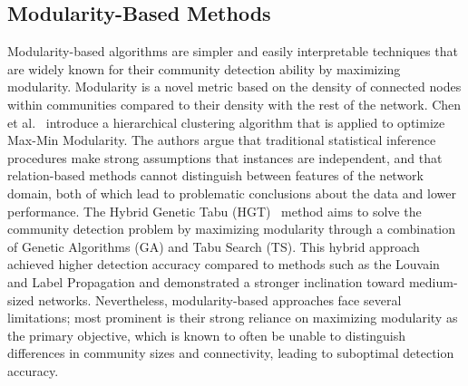 \documentclass{article}
\begin{document}
\subsection{Modularity-Based Methods}
Modularity-based algorithms are simpler and easily interpretable techniques that are widely known for their community detection ability by maximizing modularity. Modularity is a novel metric based on the density of connected nodes within communities compared to their density with the rest of the network. Chen et al.~\cite{doi:10.1137/1.9781611972795.84} introduce a hierarchical clustering algorithm that is applied to optimize Max-Min Modularity. The authors argue that traditional statistical inference procedures make strong assumptions that instances are independent, and that relation-based methods cannot distinguish between features of the network domain, both of which lead to problematic conclusions about the data and lower performance. The Hybrid Genetic Tabu (HGT)~\cite{doi:10.1080/24751839.2021.1987076} method aims to solve the community detection problem by maximizing modularity through a combination of Genetic Algorithms (GA) and Tabu Search (TS). This hybrid approach achieved higher detection accuracy compared to methods such as the Louvain and Label Propagation and demonstrated a stronger inclination toward medium-sized networks. Nevertheless, modularity-based approaches face several limitations; most prominent is their strong reliance on maximizing modularity as the primary objective, which is known to often be unable to distinguish differences in community sizes and connectivity, leading to suboptimal detection accuracy.
\end{document}
